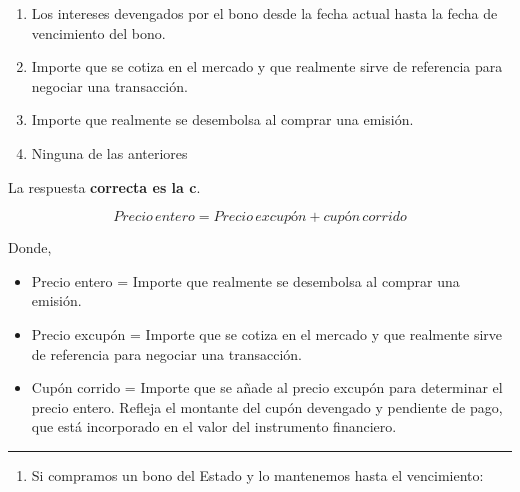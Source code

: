 \documentclass[
  letterpaper,
  DIV=11,
  numbers=noendperiod]{scrreprt}
\providecommand{\tightlist}{%
  \setlength{\itemsep}{0pt}\setlength{\parskip}{0pt}}\usepackage{longtable,booktabs,array}
\begin{document}
\begin{enumerate}
\def\labelenumi{\alph{enumi}.}
\item
  Los intereses devengados por el bono desde la fecha actual hasta la
  fecha de vencimiento del bono.
\item
  Importe que se cotiza en el mercado y que realmente sirve de
  referencia para negociar una transacción.
\item
  Importe que realmente se desembolsa al comprar una emisión.
\item
  Ninguna de las anteriores
\end{enumerate}

\begin{tcolorbox}[enhanced jigsaw, left=2mm, opacityback=0, colback=white, breakable, arc=.35mm, bottomrule=.15mm, rightrule=.15mm, toprule=.15mm, leftrule=.75mm, colframe=quarto-callout-tip-color-frame]
\begin{minipage}[t]{5.5mm}
\textcolor{quarto-callout-tip-color}{\faLightbulb}
\end{minipage}%
\begin{minipage}[t]{\textwidth - 5.5mm}

La respuesta \textbf{correcta es la c}.

\[Precio\,entero = Precio\,excupón + cupón\,corrido\]

Donde,

\begin{itemize}
\item
  Precio entero = Importe que realmente se desembolsa al comprar una
  emisión.
\item
  Precio excupón = Importe que se cotiza en el mercado y que realmente
  sirve de referencia para negociar una transacción.
\item
  Cupón corrido = Importe que se añade al precio excupón para determinar
  el precio entero. Refleja el montante del cupón devengado y pendiente
  de pago, que está incorporado en el valor del instrumento financiero.
\end{itemize}

\end{minipage}%
\end{tcolorbox}

\begin{center}\rule{0.5\linewidth}{0.5pt}\end{center}

\begin{enumerate}
\def\labelenumi{\arabic{enumi}.}
\setcounter{enumi}{111}
\tightlist
\item
  Si compramos un bono del Estado y lo mantenemos hasta el vencimiento:
\end{enumerate}
\end{document}
